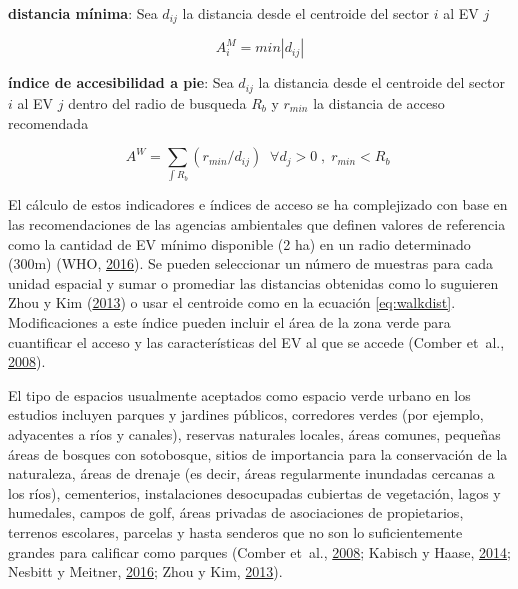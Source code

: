 \documentclass[12pt,a4paper,oneside, openany]{book}
\theoremstyle{definition}
\theoremstyle{definition}
\theoremstyle{definition}
\theoremstyle{remark}
\begin{document}
\textbf{distancia mínima}: Sea \(d_{ij}\) la distancia desde el
centroide del sector \(i\) al EV \(j\)

\begin{equation}
A^{M}_i=min\left | d_{ij} \right | 
\label{eq:mindist}
\end{equation}

\textbf{índice de accesibilidad a pie}: Sea \(d_{ij}\) la distancia
desde el centroide del sector \(i\) al EV \(j\) dentro del radio de
busqueda \(R_b\) y \(r_{min}\) la distancia de acceso recomendada

\begin{equation}
A^{W}= \sum_{\int R_b }{(r_{min}/d_{ij})}  \;  \; \forall  d_j>0 \; , \; r_{min}<R_b  \;
\label{eq:walkdist}
\end{equation}

El cálculo de estos indicadores e índices de acceso se ha complejizado
con base en las recomendaciones de las agencias ambientales que definen
valores de referencia como la cantidad de EV mínimo disponible (2 ha) en
un radio determinado (300m) (WHO,
\protect\hyperlink{ref-who2016urban}{2016}). Se pueden seleccionar un
número de muestras para cada unidad espacial y sumar o promediar las
distancias obtenidas como lo suguieren Zhou y Kim
(\protect\hyperlink{ref-zhou_social_2013}{2013}) o usar el centroide
como en la ecuación \eqref{eq:walkdist}. Modificaciones a este índice
pueden incluir el área de la zona verde para cuantificar el acceso y las
características del EV al que se accede (Comber et~al.,
\protect\hyperlink{ref-comber_using_2008}{2008}).

El tipo de espacios usualmente aceptados como espacio verde urbano en
los estudios incluyen parques y jardines públicos, corredores verdes
(por ejemplo, adyacentes a ríos y canales), reservas naturales locales,
áreas comunes, pequeñas áreas de bosques con sotobosque, sitios de
importancia para la conservación de la naturaleza, áreas de drenaje (es
decir, áreas regularmente inundadas cercanas a los ríos), cementerios,
instalaciones desocupadas cubiertas de vegetación, lagos y humedales,
campos de golf, áreas privadas de asociaciones de propietarios, terrenos
escolares, parcelas y hasta senderos que no son lo suficientemente
grandes para calificar como parques (Comber et~al.,
\protect\hyperlink{ref-comber_using_2008}{2008}; Kabisch y Haase,
\protect\hyperlink{ref-kabisch_green_2014}{2014}; Nesbitt y Meitner,
\protect\hyperlink{ref-nesbitt_exploring_2016}{2016}; Zhou y Kim,
\protect\hyperlink{ref-zhou_social_2013}{2013}).
\end{document}
